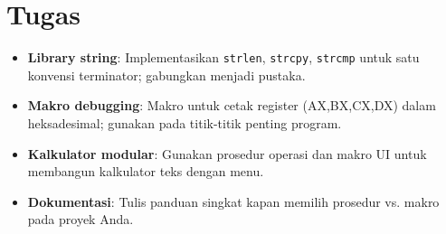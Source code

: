 \documentclass[../main.tex]{subfiles}
\begin{document}
\section{Tugas}
\begin{itemize}
  \item \textbf{Library string}: Implementasikan \texttt{strlen}, \texttt{strcpy}, \texttt{strcmp} untuk satu konvensi terminator; gabungkan menjadi pustaka.
  \item \textbf{Makro debugging}: Makro untuk cetak register (AX,BX,CX,DX) dalam heksadesimal; gunakan pada titik-titik penting program.
  \item \textbf{Kalkulator modular}: Gunakan prosedur operasi dan makro UI untuk membangun kalkulator teks dengan menu.
  \item \textbf{Dokumentasi}: Tulis panduan singkat kapan memilih prosedur vs. makro pada proyek Anda.
\end{itemize}
\end{document}
